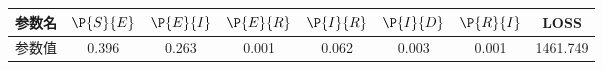 \begin{tabular}{cccccccc}
\hline
参数名&$\P{S}{E}$&$\P{E}{I}$&$\P{E}{R}$&$\P{I}{R}$&$\P{I}{D}$&$\P{R}{I}$&LOSS\\
\hline
参数值&0.396&0.263&0.001&0.062&0.003&0.001&1461.749\\
\hline
\end{tabular}